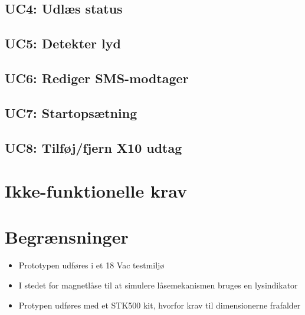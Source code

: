 
\subsection{UC4: Udlæs status}



\subsection{UC5: Detekter lyd}



\subsection{UC6: Rediger SMS-modtager}



\subsection{UC7: Startopsætning}



\subsection{UC8: Tilføj/fjern X10 udtag}



\section{Ikke-funktionelle krav}



\section{Begrænsninger} \label{sectionBegraensninger}
\begin{itemize}
	\item Prototypen udføres i et 18 Vac testmiljø
	\item I stedet for magnetlåse til at simulere låsemekanismen bruges en lysindikator
	\item Protypen udføres med et STK500 kit, hvorfor krav til dimensionerne frafalder
\end{itemize}

